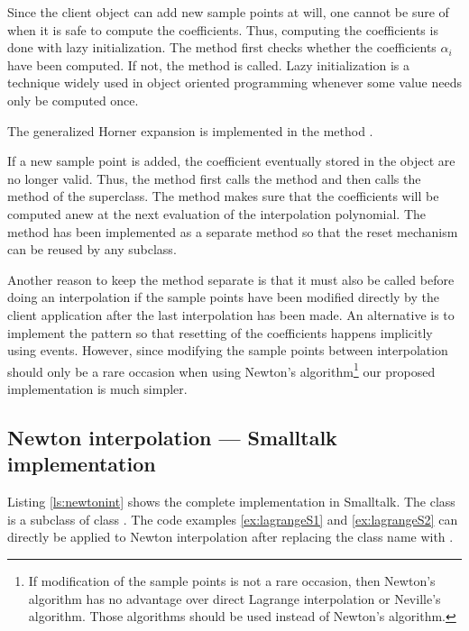 Since the client object can add new sample points at will, one
cannot be sure of when it is safe to compute the coefficients.
Thus, computing the coefficients is done with lazy initialization.
The method  first checks whether the coefficients
$\alpha_i$ have been computed. If not, the method  is called. Lazy initialization is a technique
widely used in object oriented programming whenever some value
needs only be computed once.

\noindent The generalized Horner expansion is implemented in the
method .

If a new sample point is added, the coefficient eventually stored
in the object are no longer valid. Thus, the method 
first calls the method  and then calls the
method  of the superclass. The method  makes sure that the coefficients will be
computed anew at the next evaluation of the interpolation
polynomial. The method  has been
implemented as a separate method so that the reset mechanism can
be reused by any subclass.

Another reason to keep the method  separate
is that it must also be called before doing an interpolation if
the sample points have been modified directly by the client
application after the last interpolation has been made. An
alternative is to implement the 
pattern so that resetting of the coefficients happens implicitly
using events. However, since modifying the sample points between
interpolation should only be a rare occasion when using Newton's
algorithm\footnote{If modification of the sample points is not a
rare occasion, then Newton's algorithm has no advantage over
direct Lagrange interpolation or Neville's algorithm. Those
algorithms should be used instead of Newton's algorithm.} our
proposed implementation is much simpler.

\subsection{Newton interpolation --- Smalltalk implementation}
Listing \ref{ls:newtonint} shows the complete implementation in
Smalltalk. The class  is a subclass of
class . The code examples
\ref{ex:lagrangeS1} and \ref{ex:lagrangeS2} can directly be
applied to Newton interpolation after replacing the class name  with .

